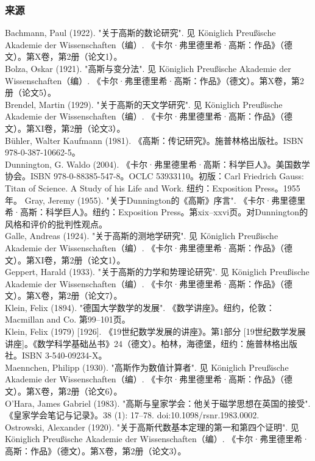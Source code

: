 \subsubsection{来源}  
Bachmann, Paul (1922). "关于高斯的数论研究". 见 Königlich Preußische Akademie der Wissenschaften（编）. 《卡尔·弗里德里希·高斯：作品》（德文）。第X卷，第2册（论文1）。\\  
Bolza, Oskar (1921). "高斯与变分法". 见 Königlich Preußische Akademie der Wissenschaften（编）. 《卡尔·弗里德里希·高斯：作品》（德文）。第X卷，第2册（论文5）。 \\ 
Brendel, Martin (1929). "关于高斯的天文学研究". 见 Königlich Preußische Akademie der Wissenschaften（编）. 《卡尔·弗里德里希·高斯：作品》（德文）。第XI卷，第2册（论文3）。\\  
Bühler, Walter Kaufmann (1981). 《高斯：传记研究》。施普林格出版社。ISBN 978-0-387-10662-5。\\ 
Dunnington, G. Waldo (2004). 《卡尔·弗里德里希·高斯：科学巨人》。美国数学协会。ISBN 978-0-88385-547-8。OCLC 53933110。初版：Carl Friedrich Gauss: Titan of Science. A Study of his Life and Work. 纽约：Exposition Press。1955年。  
Gray, Jeremy (1955). "关于Dunnington的《高斯》序言". 《卡尔·弗里德里希·高斯：科学巨人》。纽约：Exposition Press。第xix–xxvi页。对Dunnington的风格和评价的批判性观点。\\  
Galle, Andreas (1924). "关于高斯的测地学研究". 见 Königlich Preußische Akademie der Wissenschaften（编）. 《卡尔·弗里德里希·高斯：作品》（德文）。第XI卷，第2册（论文1）。\\  
Geppert, Harald (1933). "关于高斯的力学和势理论研究". 见 Königlich Preußische Akademie der Wissenschaften（编）. 《卡尔·弗里德里希·高斯：作品》（德文）。第X卷，第2册（论文7）。\\  
Klein, Felix (1894). "德国大学数学的发展". 《数学讲座》。纽约，伦敦：Macmillan and Co. 第99–101页。\\  
Klein, Felix (1979) [1926]. 《19世纪数学发展的讲座》。第1部分 [19世纪数学发展讲座]。《数学科学基础丛书》24（德文）。柏林，海德堡，纽约：施普林格出版社。ISBN 3-540-09234-X。\\  
Maennchen, Philipp (1930). "高斯作为数值计算者". 见 Königlich Preußische Akademie der Wissenschaften（编）. 《卡尔·弗里德里希·高斯：作品》（德文）。第X卷，第2册（论文6）。\\  
O'Hara, James Gabriel (1983). "高斯与皇家学会：他关于磁学思想在英国的接受". 《皇家学会笔记与记录》。38 (1): 17–78. doi:10.1098/rsnr.1983.0002. \\ 
Ostrowski, Alexander (1920). "关于高斯代数基本定理的第一和第四个证明". 见 Königlich Preußische Akademie der Wissenschaften（编）. 《卡尔·弗里德里希·高斯：作品》（德文）。第X卷，第2册（论文3）。\\  
